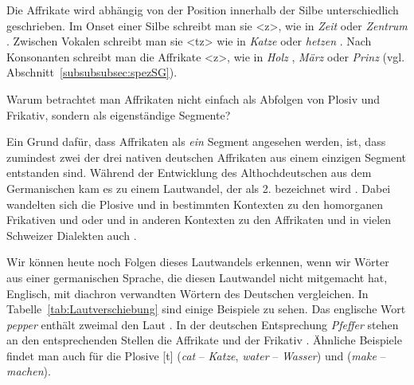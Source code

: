 Die Affrikate \textipa{[\t{ts}]} wird abhängig von der Position innerhalb der Silbe unterschiedlich geschrieben. Im Onset einer Silbe schreibt man sie <z>, wie in \textit{Zeit} \textipa{[\t{ts}\t*{aI}t]} oder \textit{Zentrum} . Zwischen Vokalen schreibt man sie <tz> wie in \textit{Katze} \textipa{[\textprimstress ka\.*{\t{ts}}@]} oder \textit{hetzen} \textipa{[\textprimstress hE\.*{\t{ts}}@n]}. Nach Konsonanten schreibt man die Affrikate <z>, wie in \textit{Holz} \textipa{[hOl\t{ts}]}, \textit{März} \textipa{[mE5\t{ts}]} oder \textit{Prinz} \textipa{[pKIn\t{ts}]} (vgl. Abschnitt~\ref{subsubsubsec:spezSG}).

\newpage
\begin{Exkurs}{Warum betrachtet man Affrikaten nicht einfach als Abfolgen von Plosiv und Frikativ, sondern als eigenständige Segmente? }
\label{Exkurs:Affrikaten}

\noindent Ein Grund dafür, dass Affrikaten als \textit{ein} Segment angesehen werden, ist, dass zumindest zwei der drei nativen deutschen Affrikaten aus einem einzigen Segment entstanden sind. Während der Entwicklung des Althochdeutschen aus dem Germanischen kam es zu einem Lautwandel, der als 2.  bezeichnet wird \citep[185--187]{Schmidt1996}. Dabei wandelten sich die Plosive \textipa{[p, t]} und \textipa{[k]} in bestimmten Kontexten zu den homorganen Frikativen \textipa{[f, s]} und \textipa{[x]} oder \textipa{[X]} und in anderen Kontexten zu den Affrikaten \textipa{[\t{pf}, \t{ts}]} und in vielen Schweizer Dialekten auch \textipa{[\t{kx}]}. 

Wir können heute noch Folgen dieses Lautwandels erkennen, wenn wir Wörter aus einer germanischen Sprache, die diesen Lautwandel nicht mitgemacht hat, \zB Englisch, mit diachron verwandten Wörtern des Deutschen vergleichen. In Tabelle~\ref{tab:Lautverschiebung} sind einige Beispiele zu sehen. Das englische Wort \textit{pepper} enthält zweimal den Laut \textipa{[p]}. In der deutschen Entsprechung \textit{Pfeffer} stehen an den entsprechenden Stellen die Affrikate \textipa{[\t{pf}]} und der Frikativ \textipa{[f]}. Ähnliche Beispiele findet man auch für die Plosive {[t]} (\textit{cat} -- \textit{Katze}, \textit{water} -- \textit{Wasser}) und \textipa{[k]} (\textit{make} -- \textit{machen}).


\end{Exkurs}
